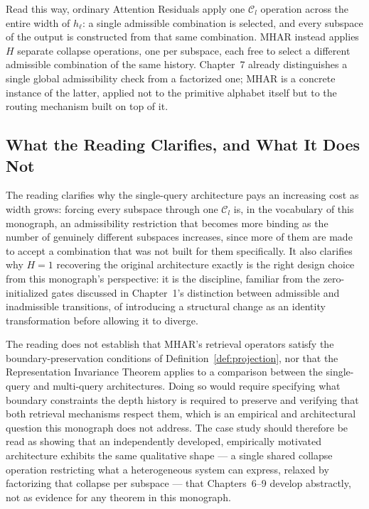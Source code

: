 \documentclass[11pt,twoside,openright]{book}
\numberwithin{equation}{chapter}
\theoremstyle{definition}
\theoremstyle{plain}
\theoremstyle{remark}
\theoremstyle{definition}
\newcommand{\Collapse}{\mathcal{C}_l}
\begin{document}
Read this way, ordinary Attention Residuals apply one $\Collapse$
operation across the entire width of $h_\ell$: a single admissible
combination is selected, and every subspace of the output is constructed
from that same combination. MHAR instead applies $H$ separate collapse
operations, one per subspace, each free to select a different admissible
combination of the same history. Chapter~7 already distinguishes a
single global admissibility check from a factorized one; MHAR is a
concrete instance of the latter, applied not to the primitive alphabet
itself but to the routing mechanism built on top of it.

\subsection{What the Reading Clarifies, and What It Does Not}

The reading clarifies why the single-query architecture pays an
increasing cost as width grows: forcing every subspace through one
$\Collapse$ is, in the vocabulary of this monograph, an admissibility
restriction that becomes more binding as the number of genuinely
different subspaces increases, since more of them are made to accept a
combination that was not built for them specifically. It also clarifies
why $H=1$ recovering the original architecture exactly is the right
design choice from this monograph's perspective: it is the discipline,
familiar from the zero-initialized gates discussed in Chapter~1's
distinction between admissible and inadmissible transitions, of
introducing a structural change as an identity transformation before
allowing it to diverge.

The reading does not establish that MHAR's retrieval operators satisfy
the boundary-preservation conditions of Definition~\ref{def:projection},
nor that the Representation Invariance Theorem applies to a comparison
between the single-query and multi-query architectures. Doing so would
require specifying what boundary constraints the depth history is
required to preserve and verifying that both retrieval mechanisms
respect them, which is an empirical and architectural question this
monograph does not address. The case study should therefore be read as
showing that an independently developed, empirically motivated
architecture exhibits the same qualitative shape --- a single shared
collapse operation restricting what a heterogeneous system can express,
relaxed by factorizing that collapse per subspace --- that Chapters~6--9
develop abstractly, not as evidence for any theorem in this monograph.
\end{document}
